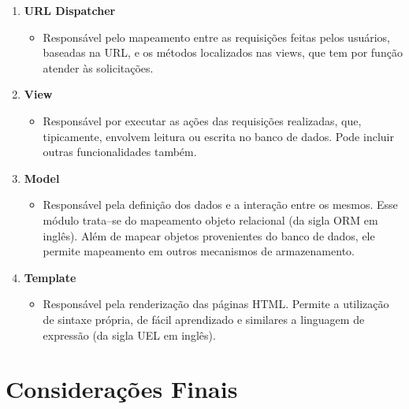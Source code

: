 \documentclass[graduacao,brazil]{ThesisPUC}
\begin{document}
\begin{enumerate}
    \item \textbf{URL Dispatcher}
    \begin{itemize}
	\item Respons\'{a}vel pelo mapeamento entre as requisi\c{c}\~{o}es feitas pelos usu\'{a}rios, baseadas na URL, 
	      e os m\'{e}todos localizados nas views, que tem por fun\c{c}\~{a}o atender \`{a}s solicita\c{c}\~{o}es.
    \end{itemize}
    \item \textbf{View}
    \begin{itemize}
	\item Respons\'{a}vel por executar as a\c{c}\~{o}es das requisi\c{c}\~{o}es realizadas, que, tipicamente,
	      envolvem leitura ou escrita no banco de dados. Pode incluir outras funcionalidades tamb\'{e}m.
    \end{itemize}
    \item \textbf{Model}
    \begin{itemize}
	\item Respons\'{a}vel pela defini\c{c}\~{a}o dos dados e a intera\c{c}\~{a}o entre os mesmos. Esse m\'{o}dulo
	      trata--se do mapeamento objeto relacional (da sigla ORM em ingl\^{e}s). Além de mapear objetos provenientes
	      do banco de dados, ele permite mapeamento em outros mecanismos de armazenamento.
    \end{itemize}
    \item \textbf{Template}
    \begin{itemize}
	\item Respons\'{a}vel pela renderiza\c{c}\~{a}o das p\'{a}ginas HTML. Permite a utiliza\c{c}\~{a}o de sintaxe
	      pr\'{o}pria, de f\'{a}cil aprendizado e similares a linguagem de express\~{a}o (da sigla UEL em ingl\^{e}s).
    \end{itemize}
\end{enumerate}


\chapter{Considera\c{c}\~{o}es Finais}


\arial


\normalfont
\end{document}
